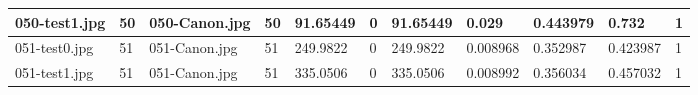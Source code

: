 \begin{landscape}
\begin{longtable}{|p{2cm}|p{1cm}|p{2cm}|p{1cm}|p{2cm}|p{1cm}|p{2cm}|p{2cm}|p{2cm}|p{2cm}|p{1cm}|}
	050-test1.jpg   & 50               & 050-Canon.jpg         & 50                          & 91.65449              & 0                       & 91.65449                   & 0.029                 & 0.443979              & 0.732                    & 1                \\ \hline
	051-test0.jpg   & 51               & 051-Canon.jpg         & 51                          & 249.9822              & 0                       & 249.9822                   & 0.008968              & 0.352987              & 0.423987                 & 1                \\ \hline
	051-test1.jpg   & 51               & 051-Canon.jpg         & 51                          & 335.0506              & 0                       & 335.0506                   & 0.008992              & 0.356034              & 0.457032                 & 1                \\ \hline
\end{longtable}
\end{landscape}

